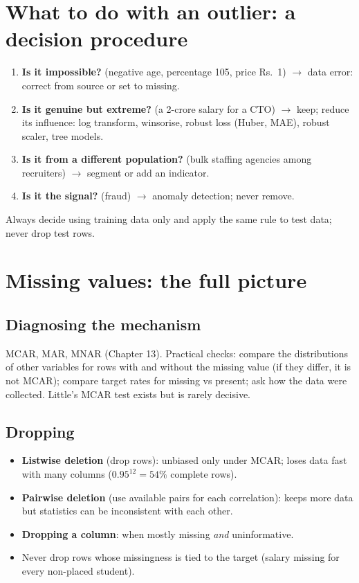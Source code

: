 \section{What to do with an outlier: a decision procedure}
\begin{enumerate}
\item \textbf{Is it impossible?} (negative age, percentage 105, price Rs.~1) $\to$ data error: correct from source or set to missing.
\item \textbf{Is it genuine but extreme?} (a 2-crore salary for a CTO) $\to$ keep; reduce its influence: log transform, winsorise, robust loss (Huber, MAE),
  robust scaler, tree models.
\item \textbf{Is it from a different population?} (bulk staffing agencies among recruiters) $\to$ segment or add an indicator.
\item \textbf{Is it the signal?} (fraud) $\to$ anomaly detection; never remove.
\end{enumerate}
Always decide using training data only and apply the same rule to test data; never drop test rows.

\section{Missing values: the full picture}
\subsection{Diagnosing the mechanism}
MCAR, MAR, MNAR (Chapter 13). Practical checks: compare the distributions of other variables for rows with and without the missing value (if they differ, it is not
MCAR); compare target rates for missing vs present; ask how the data were collected. Little's MCAR test exists but is rarely decisive.

\subsection{Dropping}
\begin{itemize}
\item \textbf{Listwise deletion} (drop rows): unbiased only under MCAR; loses data fast with many columns ($0.95^{12} = 54\%$ complete rows).
\item \textbf{Pairwise deletion} (use available pairs for each correlation): keeps more data but statistics can be inconsistent with each other.
\item \textbf{Dropping a column}: when mostly missing \emph{and} uninformative.
\item Never drop rows whose missingness is tied to the target (salary missing for every non-placed student).
\end{itemize}

